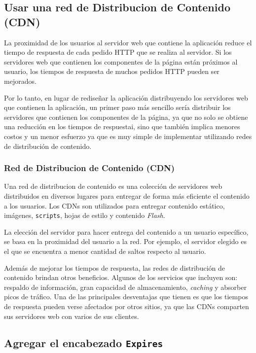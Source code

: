 \documentclass[a4paper,12pt]{report}
\begin{document}
\subsection{Usar una red de Distribucion de Contenido (CDN)}

La proximidad de los usuarios al servidor web que contiene la aplicación reduce el tiempo de respuesta
de cada pedido HTTP que se realiza al servidor. Si los servidores web que contienen
los componentes de la página están próximos al usuario, los tiempos de respuesta de muchos pedidos HTTP pueden ser mejorados.

Por lo tanto, en lugar de rediseñar la aplicación distribuyendo los servidores web que contienen la aplicación, un primer paso más sencillo sería distribuir los servidores
que contienen los componentes de la página, ya que no solo se obtiene una reducción en los tiempos de respuestai, sino que también implica menores
costos y un menor esfuerzo ya que es muy simple de implementar utilizando redes de distribución de contenido.

\subsubsection{Red de Distribucion de Contenido (CDN)}

Una red de distribucion de contenido es una colección de servidores web distribuidos en diversos
lugares para entregar de forma más eficiente el contenido a los usuarios.
Los CDNs son utilizados para entregar contenido estático, imágenes, \texttt{scripts}, hojas de estilo y contenido \emph{Flash}.

La elección del servidor para hacer entrega del contenido a un usuario específico, se basa en la proximidad del usuario a la red.
Por ejemplo, el servidor elegido es el que se encuentra a menor cantidad de saltos respecto al usuario.

Además de mejorar los tiempos de respuesta, las redes de distribución de contenido brindan otros beneficios. Algunos de los servicios que incluyen son:
respaldo de información, gran capacidad de almacenamiento, \emph{caching} y absorber picos de tráfico. Una de las principales desventajas que tienen
es que los tiempos de respuesta pueden verse afectados por otros sitios, ya que las CDNs comparten sus servidores web con varios de sus clientes.

\subsection{Agregar el encabezado \texttt{Expires}}
\end{document}
